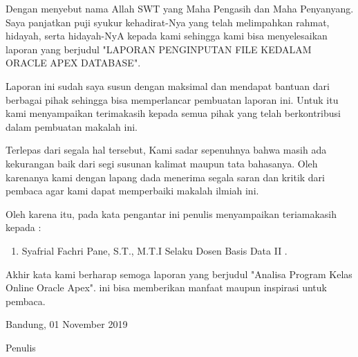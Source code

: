 \begin{acknowledgements}
Dengan menyebut nama Allah SWT yang Maha Pengasih dan Maha Penyanyang. Saya panjatkan puji syukur kehadirat-Nya yang telah melimpahkan rahmat, hidayah, serta hidayah-NyA kepada kami sehingga kami bisa menyelesaikan laporan yang berjudul "LAPORAN PENGINPUTAN FILE KEDALAM ORACLE APEX DATABASE".

Laporan ini sudah saya susun dengan maksimal dan mendapat bantuan dari berbagai pihak sehingga bisa memperlancar pembuatan laporan ini. Untuk itu kami menyampaikan terimakasih kepada semua pihak yang telah berkontribusi dalam pembuatan makalah ini.

Terlepas dari segala hal tersebut, Kami sadar sepenuhnya bahwa masih ada kekurangan baik dari segi susunan kalimat maupun tata bahasanya. Oleh karenanya kami dengan lapang dada menerima segala saran dan kritik dari pembaca agar kami dapat memperbaiki makalah ilmiah ini.



Oleh karena itu, pada kata pengantar ini penulis menyampaikan teriamakasih kepada :
\begin{enumerate}

\item  Syafrial Fachri Pane, S.T., M.T.I Selaku Dosen Basis Data II .
\end{enumerate}

Akhir kata kami berharap semoga laporan yang berjudul "Analisa Program Kelas Online Oracle Apex". ini bisa memberikan manfaat maupun inspirasi untuk pembaca.

\begin{raggedleft}

Bandung, 01 November 2019

Penulis

\end{raggedleft}

\end{acknowledgements}